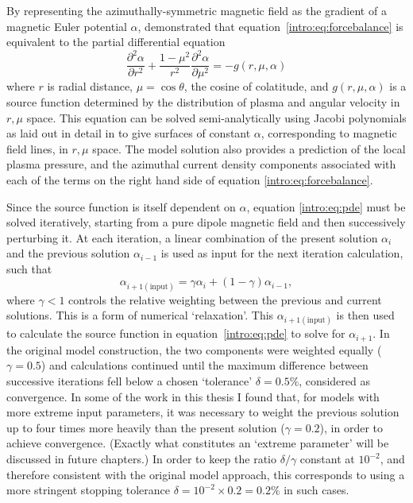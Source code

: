 {By representing the azimuthally-symmetric magnetic field as the gradient of a magnetic Euler potential $\alpha$, \citet{caudal1986} demonstrated that equation~\ref{intro:eq:forcebalance} is equivalent to the partial differential equation
\begin{equation}\label{intro:eq:pde}
\frac{\partial^2\alpha}{\partial r^2} + \frac{1-\mu^2}{r^2} \frac{\partial^2\alpha}{\partial \mu^2} = -g(r,\mu,\alpha)
\end{equation}
where $r$ is radial distance, $\mu = \cos\theta$, the cosine of colatitude, and $g(r,\mu,\alpha)$ is a source function determined by the distribution of plasma and angular velocity in $r,\mu$ space. This equation can be solved semi-analytically using Jacobi polynomials as laid out in detail in \citet[Appendix]{achilleos2010a} to give surfaces of constant $\alpha$, corresponding to magnetic field lines, in $r, \mu$ space. The model solution also provides a prediction of the local plasma pressure, and the azimuthal current density components associated with each of the terms on the right hand side of equation \ref{intro:eq:forcebalance}. 

Since the source function is itself dependent on $\alpha$, equation \ref{intro:eq:pde} must be solved iteratively, starting from a pure dipole magnetic field and then successively perturbing it. At each iteration, a linear combination of the present solution $\alpha_i$ and the previous solution $\alpha_{i-1}$ is used as input for the next iteration calculation, such that
\begin{equation}
\alpha_{i+1\mathrm{(input)}} = \gamma\alpha_i + (1-\gamma)\alpha_{i-1},
\end{equation}
where $\gamma<1$ controls the relative weighting between the previous and current solutions. This is a form of numerical `relaxation'. This $\alpha_{i+1(\mathrm{input})}$ is then used to calculate the source function in equation~\ref{intro:eq:pde} to solve for $\alpha_{i+1}$. In the original model construction, the two components were weighted equally ($\gamma=0.5$) and calculations continued until the maximum difference between successive iterations fell below a chosen `tolerance' $\delta = 0.5\%$, considered as convergence. In some of the work in this thesis I found that, for models with more extreme input parameters, it was necessary to weight the previous solution up to four times more heavily than the present solution ($\gamma=0.2$), in order to achieve convergence. (Exactly what constitutes an `extreme parameter' will be discussed in future chapters.) In order to keep the ratio $\delta/\gamma$ constant at $10^{-2}$, and therefore consistent with the original model approach, this corresponds to using a more stringent stopping tolerance $\delta = 10^{-2}\times0.2 = 0.2\%$  in such cases.

}
